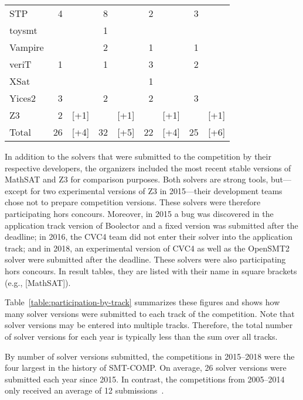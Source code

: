 \documentclass[twoside,11pt]{article}
\begin{document}
\begin{table}
\begin{tabular}{|l|r@{\,\,}r|r@{\,\,}r|r@{\,\,}r|r@{\,\,}r|}
    STP               &  4 &      &  8 &      &  2 &      &  3 &      \\
    toysmt            &    &      &  1 &      &    &      &    &      \\
    Vampire           &    &      &  2 &      &  1 &      &  1 &      \\
    veriT             &  1 &      &  1 &      &  3 &      &  2 &      \\
    XSat              &    &      &    &      &  1 &      &    &      \\
    Yices2            &  3 &      &  2 &      &  2 &      &  3 &      \\
    Z3                &  2 & [+1] &    & [+1] &    & [+1] &    & [+1] \\
    \hline
    Total             & 26 & [+4] & 32 & [+5] & 22 & [+4] & 25 & [+6] \\
    \hline
  \end{tabular}
\end{table}

In addition to the solvers that were submitted to the competition by
their respective developers, the organizers included the most recent
stable versions of MathSAT and Z3 for comparison purposes.  Both
solvers are strong tools, but---except for two experimental versions
of Z3 in 2015---their development teams chose not to prepare
competition versions.  These solvers were therefore participating hors
concours.  Moreover, in 2015 a bug was discovered in the application
track version of Boolector and a fixed version was submitted after the
deadline; in 2016, the CVC4 team did not enter their solver into the
application track; and in 2018, an experimental version of CVC4 as
well as the OpenSMT2 solver were submitted after the deadline.  These
solvers were also participating hors concours.  In result tables, they
are listed with their name in square brackets (e.g., [MathSAT]).

Table~\ref{table:participation-by-track} summarizes these figures and
shows how many solver versions were submitted to each track of the
competition.  Note that solver versions may be entered into multiple
tracks.  Therefore, the total number of solver versions for each year
is typically less than the sum over all tracks.

By number of solver versions submitted, the competitions in 2015--2018
were the four largest in the history of SMT-COMP.  On average, 26
solver versions were submitted each year since 2015.  In contrast, the
competitions from 2005--2014 only received an average of 12
submissions~\cite{CDW14}.
\end{document}

